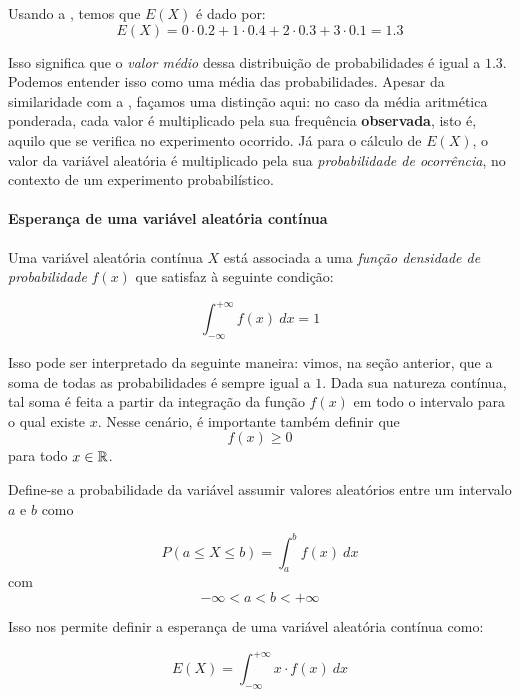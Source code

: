 \begin{sol}
Usando a , temos que $E(X)$ é dado
por:
 \[
E(X) = 0 \cdot 0.2 + 1 \cdot 0.4 + 2 \cdot 0.3 + 3 \cdot 0.1 = 1.3
\]

Isso significa que o \emph{valor médio} dessa distribuição de probabilidades é
igual a $1.3$. Podemos entender isso como uma média das probabilidades. Apesar da
similaridade com a , façamos uma distinção
aqui: no caso da média aritmética ponderada, cada valor é multiplicado pela sua
frequência \textbf{observada}, isto é, aquilo que se verifica no experimento
ocorrido. Já para o cálculo de $E(X)$, o valor da variável aleatória é
multiplicado pela sua \emph{probabilidade de ocorrência}, no contexto de um
experimento probabilístico.
\end{sol}

\paragraph{Esperança de uma variável aleatória contínua}

Uma variável aleatória contínua $X$ está associada a uma
\emph{função densidade de probabilidade} $f(x)$ que satisfaz à seguinte
condição:

\begin{equation}
    \int_{{-\infty}}^{{+\infty}} {f(x)} \: d{x} {} = 1
\end{equation}

Isso pode ser interpretado da seguinte maneira: vimos, na seção anterior, que a
soma de todas as probabilidades é sempre igual a $1$. Dada sua natureza
contínua, tal soma é feita a partir da integração da função $f(x)$ em todo o
intervalo para o qual existe $x$. Nesse cenário, é importante também definir
que
\[
f(x) \geq 0
\]
para todo $x \in \mathbb{R}$.

Define-se a probabilidade da variável assumir valores aleatórios entre um
intervalo $a$ e $b$ como

\begin{equation}
    P(a \leq X \leq b) = \int_{{a}}^{{b}} {f(x)} \: d{x} {}
\end{equation}
com
\[
-\infty < a < b < +\infty
\]

Isso nos permite definir a esperança de uma variável aleatória contínua como:

\begin{equation}
    E(X) = \int_{{-\infty}}^{{+\infty}} {x \cdot f(x)} \: d{x} {}
\end{equation}

